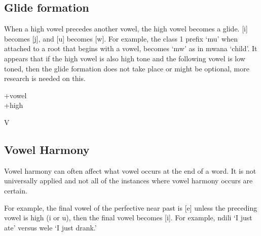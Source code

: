 \subsection{Glide formation} \label{sec:glides}
When a high vowel precedes another vowel, the high vowel becomes a glide.  [i] becomes [j], and [u] becomes [w].  For example, the class 1 prefix `mu' when attached to a root that begins with a vowel, becomes `mw' as in mwana `child'.  It appears that if the high vowel is also high tone and the following vowel is low toned, then the glide formation does not take place or might be optional, more research is needed on this.

\begin{featmatrix}+vowel\\+high\end{featmatrix} \becomes [+glide] \inthe \environ V

\subsection{Vowel Harmony}\label{sec:vowelharmony}
Vowel harmony can often affect what vowel occurs at the end of a word.  It is not universally applied and not all of the instances where vowel harmony occurs are certain.

For example, the final vowel of the perfective near past is [e] unless the preceding vowel is high (i or u), then the final vowel becomes [i].  For example, ndili `I just ate' versus \engma{}wele `I just drank.'